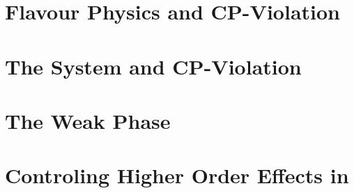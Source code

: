 \section{Flavour Physics and CP-Violation}
\label{Flavour_Physics}



\section{The \Bs System and CP-Violation}
\label{Phenomenology}


\section{The Weak Phase \phis}
\label{WeakPhase}


\section{Controling Higher Order Effects in \phis}
\label{TheBsJpsiKstDecay}

